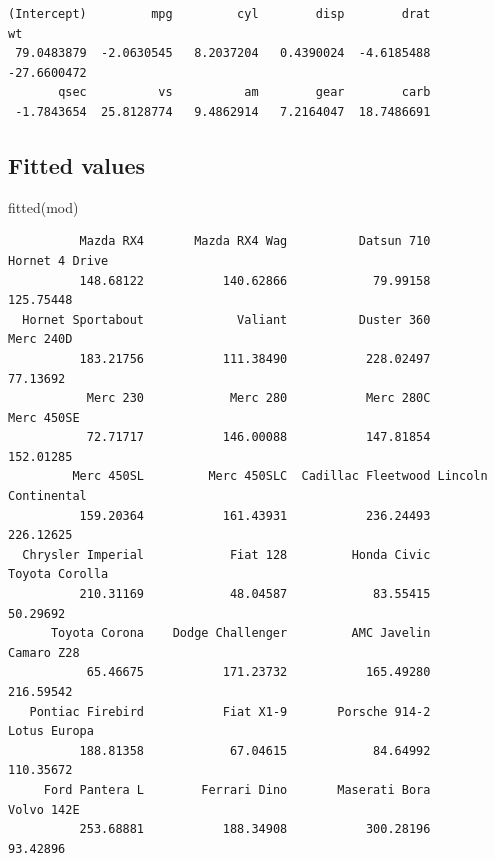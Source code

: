 \documentclass[
]{book}
\newenvironment{Shaded}{\begin{snugshade}}{\end{snugshade}}
\newcommand{\CommentTok}[1]{\textcolor[rgb]{0.56,0.35,0.01}{\textit{#1}}}
\newcommand{\FunctionTok}[1]{\textcolor[rgb]{0.00,0.00,0.00}{#1}}
\newcommand{\NormalTok}[1]{#1}
\newcommand{\SpecialCharTok}[1]{\textcolor[rgb]{0.00,0.00,0.00}{#1}}
\begin{document}
\begin{Shaded}
\end{Shaded}

\begin{verbatim}
(Intercept)         mpg         cyl        disp        drat          wt 
 79.0483879  -2.0630545   8.2037204   0.4390024  -4.6185488 -27.6600472 
       qsec          vs          am        gear        carb 
 -1.7843654  25.8128774   9.4862914   7.2164047  18.7486691 
\end{verbatim}

\hypertarget{fitted-values}{%
\subsection{Fitted values}\label{fitted-values}}

\begin{Shaded}
\begin{Highlighting}[]
\FunctionTok{fitted}\NormalTok{(mod)}
\end{Highlighting}
\end{Shaded}

\begin{verbatim}
          Mazda RX4       Mazda RX4 Wag          Datsun 710      Hornet 4 Drive 
          148.68122           140.62866            79.99158           125.75448 
  Hornet Sportabout             Valiant          Duster 360           Merc 240D 
          183.21756           111.38490           228.02497            77.13692 
           Merc 230            Merc 280           Merc 280C          Merc 450SE 
           72.71717           146.00088           147.81854           152.01285 
         Merc 450SL         Merc 450SLC  Cadillac Fleetwood Lincoln Continental 
          159.20364           161.43931           236.24493           226.12625 
  Chrysler Imperial            Fiat 128         Honda Civic      Toyota Corolla 
          210.31169            48.04587            83.55415            50.29692 
      Toyota Corona    Dodge Challenger         AMC Javelin          Camaro Z28 
           65.46675           171.23732           165.49280           216.59542 
   Pontiac Firebird           Fiat X1-9       Porsche 914-2        Lotus Europa 
          188.81358            67.04615            84.64992           110.35672 
     Ford Pantera L        Ferrari Dino       Maserati Bora          Volvo 142E 
          253.68881           188.34908           300.28196            93.42896 
\end{verbatim}
\end{document}
